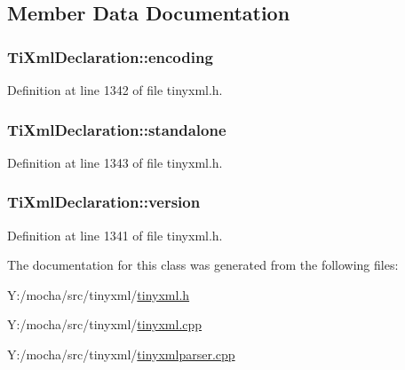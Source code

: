 \subsection{Member Data Documentation}
\hypertarget{class_ti_xml_declaration_a5eb346397dd758b4e9626fb68274d9d2}{
\subsubsection[{encoding}]{ {\bf TiXmlDeclaration::encoding}}}
\label{class_ti_xml_declaration_a5eb346397dd758b4e9626fb68274d9d2}


Definition at line 1342 of file tinyxml.h.

\hypertarget{class_ti_xml_declaration_ae061e61062658a979f8cd8cca8807440}{
\subsubsection[{standalone}]{ {\bf TiXmlDeclaration::standalone}}}
\label{class_ti_xml_declaration_ae061e61062658a979f8cd8cca8807440}


Definition at line 1343 of file tinyxml.h.

\hypertarget{class_ti_xml_declaration_a369b5e3c1a8d0cb1d62f69cdf02ead0f}{
\subsubsection[{version}]{ {\bf TiXmlDeclaration::version}}}
\label{class_ti_xml_declaration_a369b5e3c1a8d0cb1d62f69cdf02ead0f}


Definition at line 1341 of file tinyxml.h.



The documentation for this class was generated from the following files:\begin{DoxyCompactItemize}
\item 
Y:/mocha/src/tinyxml/\hyperlink{tinyxml_8h}{tinyxml.h}\item 
Y:/mocha/src/tinyxml/\hyperlink{tinyxml_8cpp}{tinyxml.cpp}\item 
Y:/mocha/src/tinyxml/\hyperlink{tinyxmlparser_8cpp}{tinyxmlparser.cpp}\end{DoxyCompactItemize}
